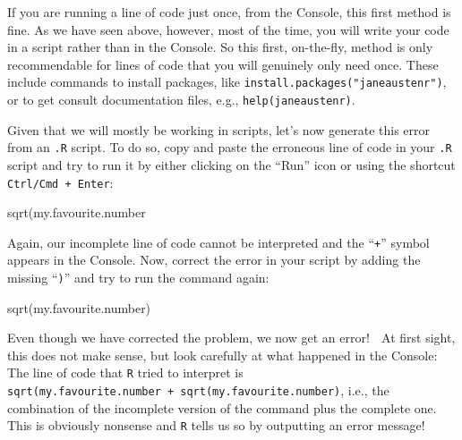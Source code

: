 \documentclass[
  letterpaper,
  DIV=11,
  numbers=noendperiod,
  oneside]{scrreprt}
\newenvironment{Shaded}{\begin{snugshade}}{\end{snugshade}}
\newcommand{\FunctionTok}[1]{\textcolor[rgb]{0.28,0.35,0.67}{#1}}
\newcommand{\NormalTok}[1]{\textcolor[rgb]{0.00,0.23,0.31}{#1}}
\begin{document}
If you are running a line of code just once, from the Console, this
first method is fine. As we have seen above, however, most of the time,
you will write your code in a script rather than in the Console. So this
first, on-the-fly, method is only recommendable for lines of code that
you will genuinely only need once. These include commands to install
packages, like \texttt{install.packages("janeaustenr")}, or to get
consult documentation files, e.g., \texttt{help(janeaustenr)}.

Given that we will mostly be working in scripts, let's now generate this
error from an \texttt{.R} script. To do so, copy and paste the erroneous
line of code in your \texttt{.R} script and try to run it by either
clicking on the ``Run'' icon or using the shortcut
\texttt{Ctrl/Cmd\ +\ Enter}:

\begin{Shaded}
\begin{Highlighting}[]
\FunctionTok{sqrt}\NormalTok{(my.favourite.number}
\end{Highlighting}
\end{Shaded}

Again, our incomplete line of code cannot be interpreted and the
``\texttt{+}'' symbol appears in the Console. Now, correct the error in
your script by adding the missing ``\texttt{)}'' and try to run the
command again:

\begin{Shaded}
\begin{Highlighting}[]
\FunctionTok{sqrt}\NormalTok{(my.favourite.number)}
\end{Highlighting}
\end{Shaded}

Even though we have corrected the problem, we now get an error! 🤯 At
first sight, this does not make sense, but look carefully at what
happened in the Console: The line of code that \texttt{R} tried to
interpret is
\texttt{sqrt(my.favourite.number\ +\ sqrt(my.favourite.number)}, i.e.,
the combination of the incomplete version of the command plus the
complete one. This is obviously nonsense and \texttt{R} tells us so by
outputting an error message!
\end{document}
